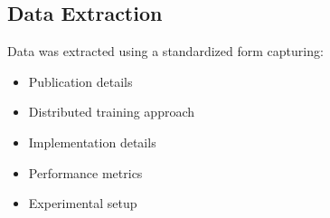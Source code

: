 \subsection{Data Extraction}
Data was extracted using a standardized form capturing:
\begin{itemize}
    \item Publication details
    \item Distributed training approach
    \item Implementation details
    \item Performance metrics
    \item Experimental setup
\end{itemize} 